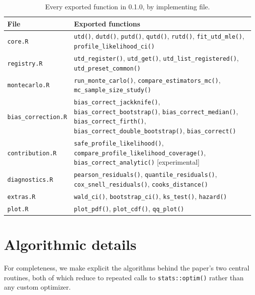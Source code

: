 \begin{table}[htbp]
\centering
\small
\begin{tabular}{@{}p{3.1cm}p{9cm}@{}}
\toprule
File & Exported functions \\
\midrule
\texttt{core.R} & \texttt{utd()}, \texttt{dutd()}, \texttt{putd()}, \texttt{qutd()}, \texttt{rutd()}, \texttt{fit\_utd\_mle()}, \texttt{profile\_likelihood\_ci()} \\
\texttt{registry.R} & \texttt{utd\_register()}, \texttt{utd\_get()}, \texttt{utd\_list\_registered()}, \texttt{utd\_preset\_common()} \\
\texttt{montecarlo.R} & \texttt{run\_monte\_carlo()}, \texttt{compare\_estimators\_mc()}, \texttt{mc\_sample\_size\_study()} \\
\texttt{bias\_correction.R} & \texttt{bias\_correct\_jackknife()}, \texttt{bias\_correct\_bootstrap()}, \texttt{bias\_correct\_median()}, \texttt{bias\_correct\_firth()}, \texttt{bias\_correct\_double\_bootstrap()}, \texttt{bias\_correct()} \\
\texttt{contribution.R} & \texttt{safe\_profile\_likelihood()}, \texttt{compare\_profile\_likelihood\_coverage()}, \texttt{bias\_correct\_analytic()} [experimental] \\
\texttt{diagnostics.R} & \texttt{pearson\_residuals()}, \texttt{quantile\_residuals()}, \texttt{cox\_snell\_residuals()}, \texttt{cooks\_distance()} \\
\texttt{extras.R} & \texttt{wald\_ci()}, \texttt{bootstrap\_ci()}, \texttt{ks\_test()}, \texttt{hazard()} \\
\texttt{plot.R} & \texttt{plot\_pdf()}, \texttt{plot\_cdf()}, \texttt{qq\_plot()} \\
\bottomrule
\end{tabular}
\caption{Every exported function in  0.1.0, by
implementing file.}
\label{tab:functions}
\end{table}

\section{Algorithmic details}
\label{sec:algorithms}

For completeness, we make explicit the algorithms behind the paper's
two central routines, both of which reduce to repeated calls to
\texttt{stats::optim()} rather than any custom optimizer.

